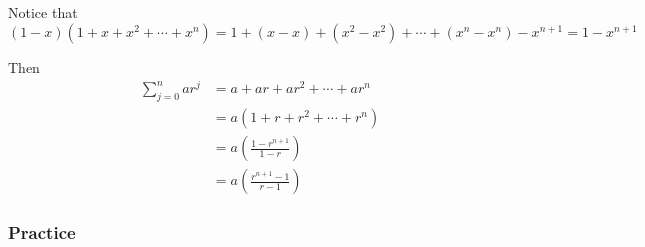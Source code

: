 \documentclass{article}
\begin{document}
Notice that $ \left( 1 - x \right) \left( 1 + x + x^2 + \cdots + x^{n} \right) = 1+ (x - x) + (x^2 - x^2) + \cdots + (x^{n} - x^{n}) - x^{n + 1} = 1 - x^{n + 1} $

Then
\begin{align*}
	\sum_{j = 0}^{n} ar^{j} & = a + ar + ar^2 + \cdots + ar^{n}                  \\
	                        & = a \left( 1 + r + r^2 + \cdots + r^{n} \right)    \\
	                        & = a \left( \frac{ 1 - r^{n + 1} }{ 1 - r } \right) \\
	                        & = a \left( \frac{ r^{n + 1} - 1 }{ r - 1 } \right)
\end{align*}

\subsubsection{Practice}
\end{document}

